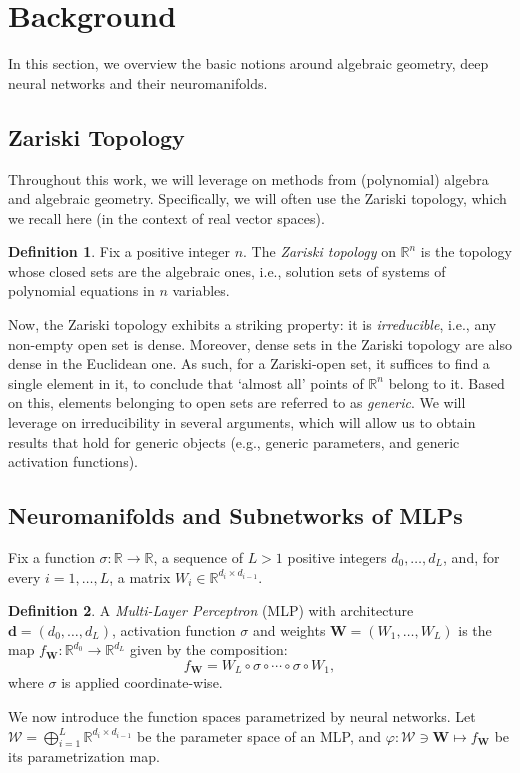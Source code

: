 \documentclass{article} %
\theoremstyle{plain}%
\theoremstyle{definition}
\newtheorem{defn}{Definition}
\theoremstyle{remark}
\begin{document}
\section{Background}
In this section, we overview the basic notions around algebraic geometry, deep neural networks and their neuromanifolds. 


\subsection{Zariski Topology}\label{sec:zar}
Throughout this work, we will leverage on methods from (polynomial) algebra and algebraic geometry. Specifically, we will often use the Zariski topology, which we recall here (in the context of real vector spaces).

\begin{defn}   
Fix a positive integer $n$. The \emph{Zariski topology} on $\mathbb{R}^n$ is the topology whose closed sets are the algebraic ones, i.e., solution sets of systems of polynomial equations in $n$ variables.
\end{defn}

Now, the Zariski topology exhibits a striking property: it is \emph{irreducible}, i.e., any non-empty open set is dense. Moreover, dense sets in the Zariski topology are also dense in the Euclidean one. As such, for a Zariski-open set, it suffices to find a single element in it, to conclude that `almost all' points of $\mathbb{R}^n$ belong to it. Based on this, elements belonging to open sets are referred to as \emph{generic}. We will leverage on irreducibility in several arguments, which will allow us to obtain results that hold for generic objects (e.g., generic parameters, and generic activation functions). 


\subsection{Neuromanifolds and Subnetworks of MLPs}
Fix a function $\sigma \colon \mathbb{R} \rightarrow \mathbb{R}$, a sequence of $L > 1$ positive integers $d_0, \ldots, d_L$, and, for every $i=1, \ldots, L$, a matrix $W_i \in \mathbb{R}^{d_i \times d_{i-1}}$.  
\begin{defn}
A \emph{Multi-Layer Perceptron} (MLP) with architecture $\mathbf{d} = (d_0, \ldots, d_L)$, activation function $\sigma$ and weights $\mathbf{W} = (W_1, \ldots, W_{L})$ is the map $f_\mathbf{W} \colon \mathbb{R}^{d_0} \rightarrow \mathbb{R}^{d_L}$ given by the composition:
\begin{equation}\label{eq:mlpdef}
f_\mathbf{W} = W_{L} \circ \sigma \circ \cdots \circ \sigma \circ W_1,
\end{equation}
where $\sigma$ is applied coordinate-wise.
\end{defn}
We now introduce the function spaces parametrized by  neural networks. Let $\mathcal{W} = \bigoplus_{i=1}^L \mathbb{R}^{d_i \times d_{i-1}}$ be the parameter space of an MLP, and  $\varphi \colon \mathcal{W} \ni \mathbf{W} \mapsto f_\mathbf{W}$ be its parametrization map. 
\end{document}
